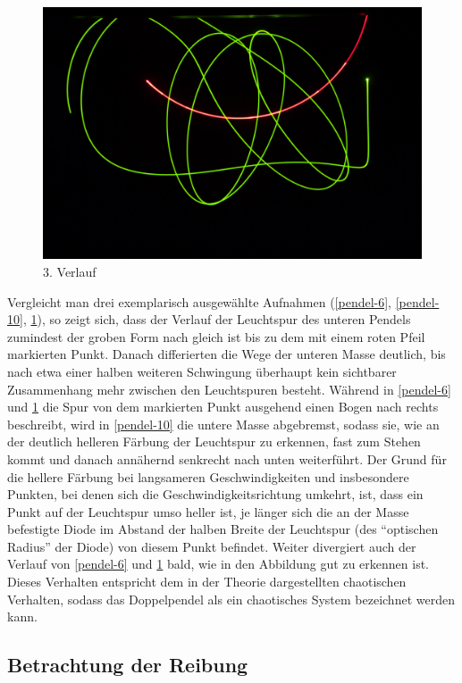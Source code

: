 \begin{figure}
        \includegraphics[width=.9\textwidth]{images/pendel-9}
\caption{3. Verlauf}
\label{pendel-9}
\end{figure}



Vergleicht man drei exemplarisch ausgewählte Aufnahmen (\ref{pendel-6}, \ref{pendel-10}, \ref{pendel-9}), so zeigt sich, dass der Verlauf der Leuchtspur des unteren Pendels zumindest der groben Form nach gleich ist bis zu dem mit einem roten Pfeil markierten Punkt. Danach differierten die Wege der unteren Masse deutlich, bis nach etwa einer halben weiteren Schwingung überhaupt kein sichtbarer Zusammenhang mehr zwischen den Leuchtspuren besteht. Während in \ref{pendel-6} und \ref{pendel-9} die Spur von dem markierten Punkt ausgehend einen Bogen nach rechts beschreibt, wird in \ref{pendel-10} die untere Masse abgebremst, sodass sie, wie an der deutlich helleren Färbung der Leuchtspur zu erkennen, fast zum Stehen kommt und danach annähernd senkrecht nach unten weiterführt. Der Grund für die hellere Färbung bei langsameren Geschwindigkeiten und insbesondere Punkten, bei denen sich die Geschwindigkeitsrichtung umkehrt, ist, dass ein Punkt auf der Leuchtspur umso heller ist, je länger sich die an der Masse befestigte Diode im Abstand der halben Breite der Leuchtspur (des \enquote{optischen Radius} der Diode) von diesem Punkt befindet. 
Weiter divergiert auch der Verlauf von \ref{pendel-6} und \ref{pendel-9} bald, wie in den Abbildung gut zu erkennen ist. 
Dieses Verhalten entspricht dem in der Theorie dargestellten chaotischen Verhalten, sodass das Doppelpendel als ein chaotisches System bezeichnet werden kann. 

\subsection{Betrachtung der Reibung}
